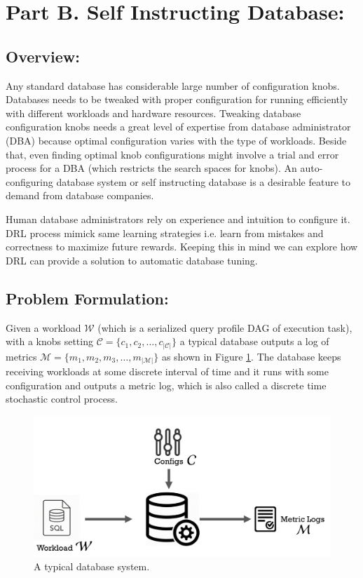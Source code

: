 \section{Part B.  Self Instructing Database:}
\label{part_b}
\subsection{Overview:}
Any standard database has considerable large number of configuration knobs. Databases needs to be tweaked with proper configuration for running efficiently with different workloads and hardware resources. Tweaking database configuration knobs needs a great level of expertise from database administrator (DBA) because optimal configuration varies with the type of workloads. Beside that, even finding optimal knob configurations might involve a trial and error process for a DBA (which restricts the search spaces for knobs). An auto-configuring database system or self instructing database is a desirable feature to demand from database companies.


Human database administrators rely on experience and intuition to configure it. DRL process mimick same learning strategies i.e. learn from mistakes and correctness to maximize future rewards. Keeping this in mind we can explore how DRL can provide a solution to automatic database tuning.


\subsection{Problem Formulation:}
Given a workload $\mathcal{W}$ (which is a serialized query profile DAG of execution task), with a knobs setting $\mathcal{C} = \{c_1,c_2,\ldots,c_{|\mathcal{C}|}\}$ a typical database outputs a log of metrics $\mathcal{M} = \{m_1,m_2,m_3,\ldots,m_{|\mathcal{M}|}\}$ as shown in Figure \ref{fig:database_01}.
The database keeps receiving workloads at some discrete interval of time and it runs with some configuration and outputs a metric log, which is also called a discrete time stochastic control process.

\begin{figure}[h]
	\includegraphics[width=0.9\linewidth ]{fig/database_01.png}
    \vspace{-2mm}
    \caption{A typical database system.}
    \label{fig:database_01}
\end{figure}


